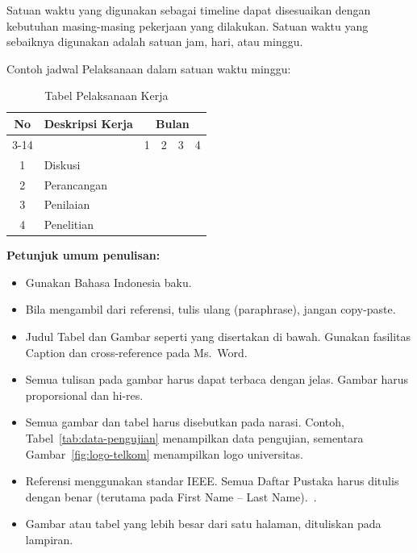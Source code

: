 \documentclass[a4paper,11pt,oneside]{report}
\begin{document}
Satuan waktu yang digunakan sebagai timeline dapat disesuaikan dengan kebutuhan
masing-masing pekerjaan yang dilakukan. Satuan waktu yang sebaiknya digunakan
adalah satuan jam, hari, atau minggu.

Contoh jadwal Pelaksanaan dalam satuan waktu minggu:

\begin{table}[H]
    \caption{Tabel Pelaksanaan Kerja}
    \label{tab:jadwal-kerja}
    \centering
    \footnotesize
    \begin{tabular}{|c|p{3.2cm}|*{12}{c|}}
        \hline
        \multirow{2}{*}{No} & \multirow{2}{*}{Deskripsi Kerja} & \multicolumn{12}{c|}{Bulan} \\ \cline{3-14}
         & & \multicolumn{3}{c|}{1} & \multicolumn{3}{c|}{2} & \multicolumn{3}{c|}{3} & \multicolumn{3}{c|}{4} \\ \hline
        1 & Diskusi      & \multicolumn{12}{c|}{} \\ \hline
        2 & Perancangan  & \multicolumn{12}{c|}{} \\ \hline
        3 & Penilaian    & \multicolumn{12}{c|}{} \\ \hline
        4 & Penelitian   & \multicolumn{12}{c|}{} \\ \hline
    \end{tabular}
\end{table}

\noindent\textbf{Petunjuk umum penulisan:}
\begin{itemize}
    \item Gunakan Bahasa Indonesia baku.
    \item Bila mengambil dari referensi, tulis ulang (paraphrase), jangan copy-paste.
    \item Judul Tabel dan Gambar seperti yang disertakan di bawah. Gunakan
    fasilitas Caption dan cross-reference pada Ms.\ Word.
    \item Semua tulisan pada gambar harus dapat terbaca dengan jelas. Gambar
    harus proporsional dan hi-res.
    \item Semua gambar dan tabel harus disebutkan pada narasi. Contoh,
    Tabel~\ref{tab:data-pengujian} menampilkan data pengujian, sementara
    Gambar~\ref{fig:logo-telkom} menampilkan logo universitas.
    \item Referensi menggunakan standar IEEE. Semua Daftar Pustaka harus ditulis
    dengan benar (terutama pada First Name -- Last Name).~\cite{ref1,ref2,ref3,ref4,ref5}.
    \item Gambar atau tabel yang lebih besar dari satu halaman, dituliskan pada
    lampiran.
\end{itemize}
\end{document}
